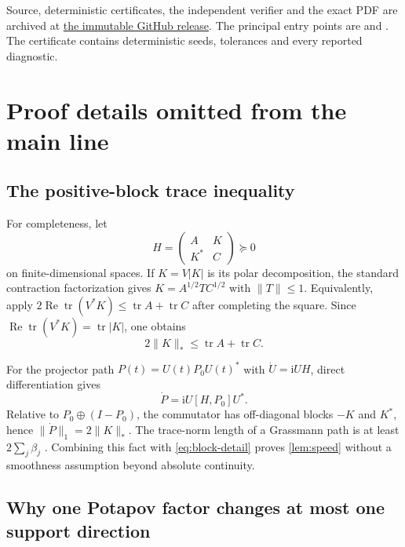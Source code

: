 \documentclass[11pt]{article}
\theoremstyle{definition}
\theoremstyle{remark}
\newcommand{\tr}{\operatorname{tr}}
\begin{document}
Source, deterministic certificates, the independent verifier and the exact
PDF are archived at
\href{https://github.com/lluiseriksson/finite-sample-spectral-certificates/releases/tag/v1.9-action-memory-diamond-final}{the immutable GitHub release}.  The principal entry points are
 and
.  The certificate
contains deterministic seeds, tolerances and every reported diagnostic.

\appendix

\section{Proof details omitted from the main line}

\subsection{The positive-block trace inequality}

For completeness, let
\[
 H=\begin{pmatrix}A&K\\K^*&C\end{pmatrix}\succeq0
\]
on finite-dimensional spaces.  If $K=V|K|$ is its polar decomposition, the
standard contraction factorization gives $K=A^{1/2}TC^{1/2}$ with
$\lVert T\rVert\le1$.  Equivalently, apply
$2\operatorname{Re}\tr(V^*K)\le\tr A+\tr C$ after completing the square.
Since $\operatorname{Re}\tr(V^*K)=\tr|K|$, one obtains
\begin{equation}\label{eq:block-detail}
 2\lVert K\rVert_*\le\tr A+\tr C.
\end{equation}

For the projector path $P(t)=U(t)P_0U(t)^*$ with
$\dot U=\mathrm iUH$, direct differentiation gives
\[
 \dot P=\mathrm iU[H,P_0]U^*.
\]
Relative to $P_0\oplus(I-P_0)$, the commutator has off-diagonal blocks
$-K$ and $K^*$, hence $\lVert\dot P\rVert_1=2\lVert K\rVert_*$.  The
trace-norm length of a Grassmann path is at least
$2\sum_j\beta_j$ \cite[Thm.~1]{QiuZhangLi2005}
\cite[Thm.~20]{AntezanaLarotondaVarela2014}.  Combining this fact with
\eqref{eq:block-detail} proves
\cref{lem:speed} without a smoothness assumption beyond absolute
continuity.

\subsection{Why one Potapov factor changes at most one support direction}
\end{document}
